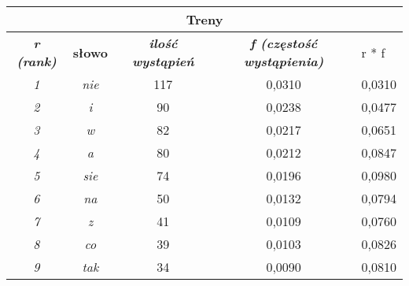 \documentclass[a4paper]{article}
\begin{document}
\begin{table}
\begin{tabular}{ccc|c|l|}
\hline
\multicolumn{5}{|c|}{\textbf{Treny}}                                                                                                                                             \\ \hline
\multicolumn{1}{|c|}{\textit{\textbf{r (rank)}}} & \multicolumn{1}{c|}{\textbf{słowo}} & \textit{\textbf{ilość wystąpień}} & \textit{\textbf{f (częstość wystąpienia)}} & r * f  \\ \hline
\multicolumn{1}{|c|}{\textit{1}}                 & \multicolumn{1}{c|}{\textit{nie}}   & 117                               & 0,0310                                     & 0,0310 \\ \hline
\multicolumn{1}{|c|}{\textit{2}}                 & \multicolumn{1}{c|}{\textit{i}}     & 90                                & 0,0238                                     & 0,0477 \\ \hline
\multicolumn{1}{|c|}{\textit{3}}                 & \multicolumn{1}{c|}{\textit{w}}     & 82                                & 0,0217                                     & 0,0651 \\ \hline
\multicolumn{1}{|c|}{\textit{4}}                 & \multicolumn{1}{c|}{\textit{a}}     & 80                                & 0,0212                                     & 0,0847 \\ \hline
\multicolumn{1}{|c|}{\textit{5}}                 & \multicolumn{1}{c|}{\textit{sie}}   & 74                                & 0,0196                                     & 0,0980 \\ \hline
\multicolumn{1}{|c|}{\textit{6}}                 & \multicolumn{1}{c|}{\textit{na}}    & 50                                & 0,0132                                     & 0,0794 \\ \hline
\multicolumn{1}{|c|}{\textit{7}}                 & \multicolumn{1}{c|}{\textit{z}}     & 41                                & 0,0109                                     & 0,0760 \\ \hline
\multicolumn{1}{|c|}{\textit{8}}                 & \multicolumn{1}{c|}{\textit{co}}    & 39                                & 0,0103                                     & 0,0826 \\ \hline
\multicolumn{1}{|c|}{\textit{9}}                 & \multicolumn{1}{c|}{\textit{tak}}   & 34                                & 0,0090                                     & 0,0810 \\ \hline

\end{tabular}
\end{table}
\end{document}
